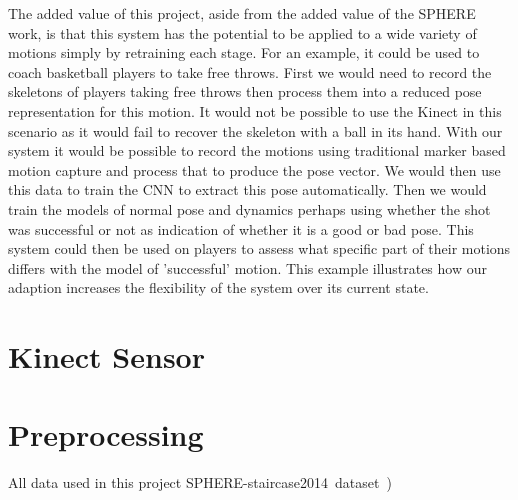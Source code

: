 \documentclass[11pt]{article} %
\begin{document}
The added value of this project, aside from the added value of the SPHERE work, is that this system has the potential to be applied to a wide variety of motions simply by retraining each stage. For an example, it could be used to coach basketball players to take free throws. First we would need to record the skeletons of players taking free throws then process them into a reduced pose representation for this motion. It would not be possible to use the Kinect in this scenario as it would fail to recover the skeleton with a ball in its hand. With our system it would be possible to record the motions using traditional marker based motion capture and process that to produce the pose vector. We would then use this data to train the CNN to extract this pose automatically. Then we would train the models of normal pose and dynamics perhaps using whether the shot was successful or not as indication of whether it is a good or bad pose. This system could then be used on players to assess what specific part of their motions differs with the model of 'successful' motion. This example illustrates how our adaption increases the flexibility of the system over its current state.




\section{Kinect Sensor}

\section{Preprocessing}
\label{sec:intro}
All data used in this project SPHERE-staircase2014~dataset~\cite{Paiement}) 




\end{document}

